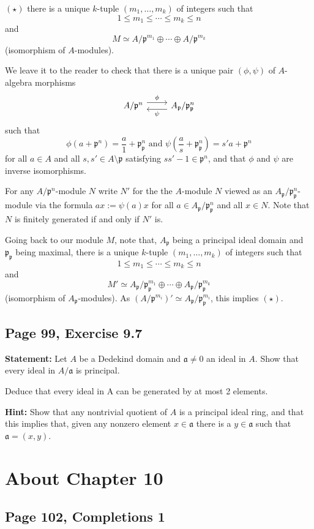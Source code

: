 \documentclass[parskip=half,fontsize=12pt]{scrartcl}%
\newcommand{\mf}{\mathfrak}
\newcommand{\aaa}{\mf a}
\newcommand{\ppp}{\mf p}
\begin{document}
$(\star)$ there is a unique $k$-tuple $(m_1,\dots,m_k)$ of integers such that 
$$
1\le m_1\le\cdots\le m_k\le n
$$ 
and 
$$
M\simeq A/\ppp^{m_1}\oplus\cdots\oplus A/\ppp^{m_k}
$$ 
(isomorphism of $A$-modules).

We leave it to the reader to check that there is a unique pair $(\phi,\psi)$ of $A$-algebra morphisms 
$$
\begin{tikzcd}
A/\ppp^n\ar[r,yshift=0.9ex,"\phi"]&A_\ppp/\ppp_\ppp^n\ar[l,yshift=-0.9ex,"\psi"]
\end{tikzcd}
$$ 
such that 
$$
\phi(a+\ppp^n)=\frac a1+\ppp_\ppp^n\text{ and }\psi\left(\frac as+\ppp_\ppp^n\right)=s'a+\ppp^n
$$ 
for all $a\in A$ and all $s,s'\in A\setminus\ppp$ satisfying $ss'-1\in\ppp^n$, and that $\phi$ and $\psi$ are inverse isomorphisms. 

For any $A/\ppp^n$-module $N$ write $N'$ for the the $A$-module $N$ viewed as an $A_\ppp/\ppp_\ppp^n$-module via the formula $ax:=\psi(a)x$ for all $a\in A_\ppp/\ppp_\ppp^n$ and all $x\in N$. Note that $N$ is finitely generated if and only if $N'$ is.  

Going back to our module $M$, note that, $A_\ppp$ being a principal ideal domain and $\ppp_\ppp$ being maximal, there is a unique $k$-tuple $(m_1,\dots,m_k)$ of integers such that 
$$
1\le m_1\le\cdots\le m_k\le n
$$ 
and 
$$
M'\simeq A_\ppp/\ppp_\ppp^{m_1}\oplus\cdots\oplus A_\ppp/\ppp_\ppp^{m_k}
$$ 
(isomorphism of $A_\ppp$-modules). As $(A/\ppp^{m_i})'\simeq A_\ppp/\ppp_\ppp^{m_i}$, this implies $(\star)$. 

\subsection{Page 99, Exercise 9.7}%

\textbf{Statement:} Let $A$ be a Dedekind domain and $\aaa\ne0$ an ideal in $A$. Show that every ideal in $A/\aaa$ is principal.

Deduce that every ideal in A can be generated by at most 2 elements. 

\textbf{Hint:} Show that any nontrivial quotient of $A$ is a principal ideal ring, and that this implies that, given any nonzero element $x\in\aaa$ there is a $y\in\aaa$ such that $\aaa=(x,y)$. 

\section{About Chapter 10}%

\subsection{Page 102, Completions 1}%
\end{document}
